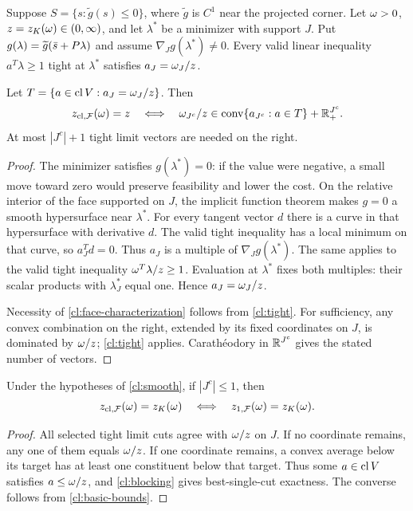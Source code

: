 \begin{proposition}\label{cl:smooth}
Suppose $S=\{s:\widetilde g(s)\le0\}$, where $\widetilde g$ is $C^1$
near the projected corner. Let $\omega>0$, $z=z_K(\omega)\in(0,\infty)$,
and let $\lambda^*$ be a minimizer with support $J$. Put
$g(\lambda)=\widetilde g(\bar s+P\lambda)$ and assume
$\nabla_Jg(\lambda^*)\ne0$.
Every valid linear inequality $a^T\lambda\ge1$ tight at $\lambda^*$
satisfies $a_J=\omega_J/z$.

Let $T=\{a\in\operatorname{cl} V:a_J=\omega_J/z\}$. Then
\begin{equation}\label{cl:face-characterization}
 z_{\mathrm{cl},\mathcal F}(\omega)=z
 \quad\Longleftrightarrow\quad
 \omega_{J^c}/z\in\operatorname{conv}\{a_{J^c}:a\in T\}+\mathbb R_+^{J^c}.
\end{equation}
At most $|J^c|+1$ tight limit vectors are needed on the right.
\end{proposition}

\begin{proof}
The minimizer satisfies $g(\lambda^*)=0$: if the value were negative,
a small move toward zero would preserve feasibility and lower the cost.
On the relative interior of the face supported on $J$, the implicit
function theorem makes $g=0$ a smooth hypersurface near $\lambda^*$.
For every tangent vector $d$ there is a curve in that hypersurface with
derivative $d$. The valid tight inequality has a local minimum on that
curve, so $a_J^Td=0$. Thus $a_J$ is a multiple of
$\nabla_Jg(\lambda^*)$. The same applies to the valid tight inequality
$\omega^T\lambda/z\ge1$. Evaluation at $\lambda^*$ fixes both multiples:
their scalar products with $\lambda^*_J$ equal one. Hence
$a_J=\omega_J/z$.

Necessity of \cref{cl:face-characterization} follows from
\cref{cl:tight}. For sufficiency, any convex combination on the right,
extended by its fixed coordinates on $J$, is dominated by $\omega/z$;
\cref{cl:tight} applies. Carath\'eodory in $\mathbb R^{J^c}$ gives the stated
number of vectors.
\end{proof}

\begin{corollary}\label{cl:one-unused}
Under the hypotheses of \cref{cl:smooth}, if $|J^c|\le1$, then
\[
 z_{\mathrm{cl},\mathcal F}(\omega)=z_K(\omega)
 \quad\Longleftrightarrow\quad z_{1,\mathcal F}(\omega)=z_K(\omega).
\]
\end{corollary}

\begin{proof}
All selected tight limit cuts agree with $\omega/z$ on $J$.
If no coordinate remains, any one of them equals $\omega/z$.
If one coordinate remains, a convex average below its target has at least
one constituent below that target. Thus some $a\in\operatorname{cl} V$ satisfies
$a\le\omega/z$, and \cref{cl:blocking} gives best-single-cut exactness.
The converse follows from \cref{cl:basic-bounds}.
\end{proof}

